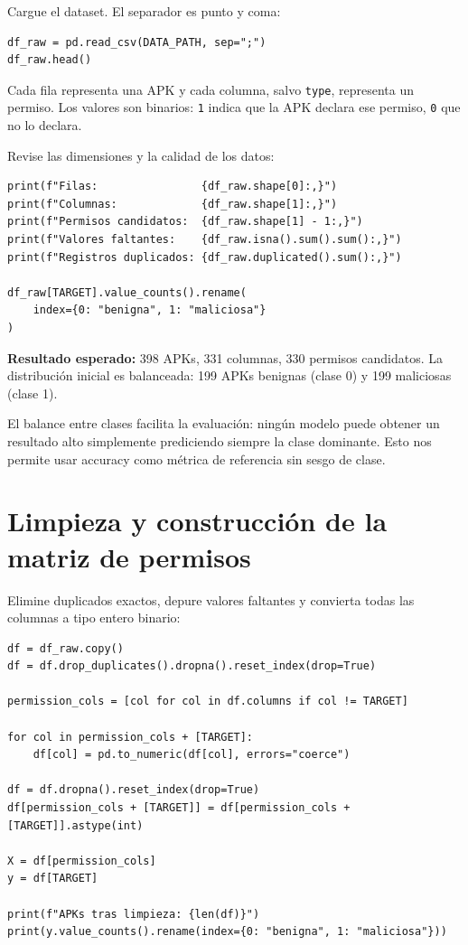 \documentclass[
  coursetitle={Cómputo Nube y Tecnologías Emergentes},
  coursehours={96},
  coursedate={Verano 2026},
  doctype={Tutorial},
  otherlangs={english,french},
  authorname={Lázaro},
  authorsurname={Bustio-Martínez},
  authortitle={PhD},
  role={Profesor Investigador},
  email={lbustio@inaoe.mx},
  phone={5559504000},
  ext={7459},
  institution={Instituto Nacional de Astrofísica, Óptica y Electrónica (INAOE)},
  department={Maestría en Ciencias en Tecnologías de Seguridad},
  address={Luis Enrique Erro 1, Sta. Ma. Tonantzintla, San Andrés Cholula, CP 72840, Puebla, México},
  margin={0.5in}
]{../../lbustio_lecture_notes}
\begin{document}
Cargue el dataset. El separador es punto y coma:

\begin{lstlisting}
df_raw = pd.read_csv(DATA_PATH, sep=";")
df_raw.head()
\end{lstlisting}

Cada fila representa una APK y cada columna, salvo \texttt{type}, representa un permiso. Los valores son binarios: \texttt{1} indica que la APK declara ese permiso, \texttt{0} que no lo declara.

Revise las dimensiones y la calidad de los datos:

\begin{lstlisting}
print(f"Filas:                {df_raw.shape[0]:,}")
print(f"Columnas:             {df_raw.shape[1]:,}")
print(f"Permisos candidatos:  {df_raw.shape[1] - 1:,}")
print(f"Valores faltantes:    {df_raw.isna().sum().sum():,}")
print(f"Registros duplicados: {df_raw.duplicated().sum():,}")

df_raw[TARGET].value_counts().rename(
    index={0: "benigna", 1: "maliciosa"}
)
\end{lstlisting}

\textbf{Resultado esperado:} 398 APKs, 331 columnas, 330 permisos candidatos. La distribución inicial es balanceada: 199 APKs benignas (clase 0) y 199 maliciosas (clase 1).

\begin{tcolorbox}[title=Interpretación]
El balance entre clases facilita la evaluación: ningún modelo puede obtener un resultado alto simplemente prediciendo siempre la clase dominante. Esto nos permite usar accuracy como métrica de referencia sin sesgo de clase.
\end{tcolorbox}

\section{Limpieza y construcción de la matriz de permisos}

Elimine duplicados exactos, depure valores faltantes y convierta todas las columnas a tipo entero binario:

\begin{lstlisting}
df = df_raw.copy()
df = df.drop_duplicates().dropna().reset_index(drop=True)

permission_cols = [col for col in df.columns if col != TARGET]

for col in permission_cols + [TARGET]:
    df[col] = pd.to_numeric(df[col], errors="coerce")

df = df.dropna().reset_index(drop=True)
df[permission_cols + [TARGET]] = df[permission_cols + [TARGET]].astype(int)

X = df[permission_cols]
y = df[TARGET]

print(f"APKs tras limpieza: {len(df)}")
print(y.value_counts().rename(index={0: "benigna", 1: "maliciosa"}))
\end{lstlisting}
\end{document}
